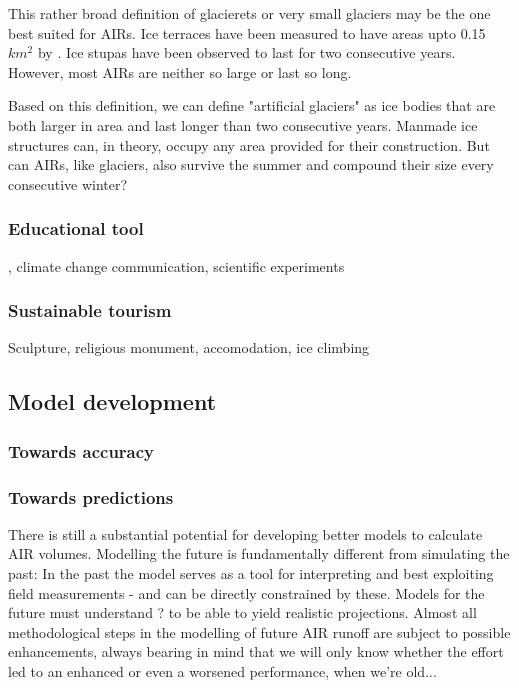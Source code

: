 This rather broad definition of glacierets or very small glaciers may be the one best suited for AIRs. Ice
terraces have been measured to have areas upto 0.15 $km^2$ by
\citet{nusserSociohydrologyArtificialGlaciers2019}. Ice stupas have been observed to last for two consecutive
years. However, most AIRs are neither so large or last so long.

Based on this definition, we can define "artificial glaciers" as ice bodies that are both larger in area and
last longer than two consecutive years. Manmade ice structures can, in theory, occupy any area provided for
their construction. But can AIRs, like glaciers, also survive the summer and compound their size every
consecutive winter? 

\subsubsection{Educational tool}

, climate change communication, scientific experiments

\subsubsection{Sustainable tourism}

Sculpture, religious monument, accomodation, ice climbing


\subsection{Model development}

\subsubsection{Towards accuracy}


\subsubsection{Towards predictions}

There is still a substantial potential for developing better models to calculate AIR volumes. Modelling the
future is fundamentally different from simulating the past: In the past the model serves as a tool for
interpreting and best exploiting field measurements - and can be directly constrained by these. Models for the
future must understand ? to be able to yield realistic projections. Almost all methodological steps in the
modelling of future AIR runoff are subject to possible enhancements, always bearing in mind that we will only
know whether the effort led to an enhanced or even a worsened performance, when we're old... 


